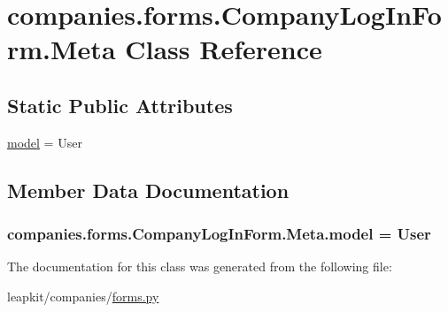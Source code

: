 \hypertarget{classcompanies_1_1forms_1_1_company_log_in_form_1_1_meta}{\section{companies.\-forms.\-Company\-Log\-In\-Form.\-Meta Class Reference}
\label{classcompanies_1_1forms_1_1_company_log_in_form_1_1_meta}
}
\subsection*{Static Public Attributes}
\begin{DoxyCompactItemize}
\item 
\hyperlink{classcompanies_1_1forms_1_1_company_log_in_form_1_1_meta_a512bd15208cb00527ec8fe8e4b57ce02}{model} = User
\end{DoxyCompactItemize}


\subsection{Member Data Documentation}
\hypertarget{classcompanies_1_1forms_1_1_company_log_in_form_1_1_meta_a512bd15208cb00527ec8fe8e4b57ce02}{
\subsubsection[{model}]{\setlength{\rightskip}{0pt plus 5cm}companies.\-forms.\-Company\-Log\-In\-Form.\-Meta.\-model = User\hspace{0.3cm}{\ttfamily [static]}}}\label{classcompanies_1_1forms_1_1_company_log_in_form_1_1_meta_a512bd15208cb00527ec8fe8e4b57ce02}


The documentation for this class was generated from the following file\-:\begin{DoxyCompactItemize}
\item 
leapkit/companies/\hyperlink{companies_2forms_8py}{forms.\-py}\end{DoxyCompactItemize}
